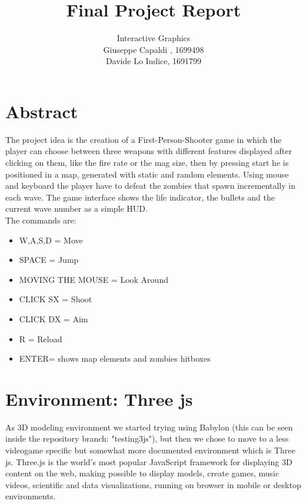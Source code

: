 \documentclass[14pt]{extarticle}
\begin{document}
 
\title{Final Project Report}%
\author{Interactive Graphics
\\Giuseppe Capaldi%
, 1699498 \\
Davide Lo Iudice, 1691799\\
} %
\date{}

\maketitle

\section{Abstract}

The project idea is the creation of a First-Person-Shooter game in which the player can choose between three weapons with different features displayed after clicking on them, like the fire rate or the mag size, then by pressing start he is positioned in a map, generated with static and random elements. Using mouse and keyboard the player have to defeat the zombies that spawn incrementally in each wave. The game interface shows the life indicator, the bullets and the current wave number as a simple HUD.\\
The commands are: 
\begin{itemize}
\item W,A,S,D = Move
\item SPACE = Jump
\item MOVING THE MOUSE = Look Around
\item CLICK SX = Shoot 
\item CLICK DX = Aim
\item R = Reload
\item ENTER= shows map elements and zombies hitboxes
\end{itemize}
\section{Environment: Three js}

As 3D modeling environment we started trying using Babylon (this can be seen inside the repository branch: "testing3js"), but then we chose to move to a less videogame specific but somewhat more documented environment which is Three js. 
Three.js is the world's most popular JavaScript framework for displaying 3D content on the web, making possible to display models, create games, music videos, scientific and data visualizations, running on browser in mobile or desktop environments.
\end{document}
